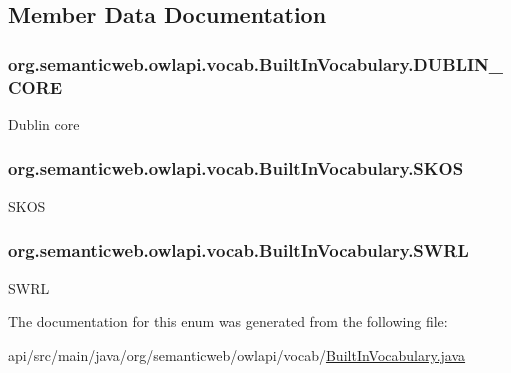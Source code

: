 \subsection{Member Data Documentation}
\hypertarget{enumorg_1_1semanticweb_1_1owlapi_1_1vocab_1_1_built_in_vocabulary_a59c8156f744b057885d6bc7dec488220}{
\subsubsection[{D\-U\-B\-L\-I\-N\-\_\-\-C\-O\-R\-E}]{\setlength{\rightskip}{0pt plus 5cm}org.\-semanticweb.\-owlapi.\-vocab.\-Built\-In\-Vocabulary.\-D\-U\-B\-L\-I\-N\-\_\-\-C\-O\-R\-E}}\label{enumorg_1_1semanticweb_1_1owlapi_1_1vocab_1_1_built_in_vocabulary_a59c8156f744b057885d6bc7dec488220}
Dublin core \hypertarget{enumorg_1_1semanticweb_1_1owlapi_1_1vocab_1_1_built_in_vocabulary_a662cb60c5cb7ce1b88b42f318b2f8699}{
\subsubsection[{S\-K\-O\-S}]{\setlength{\rightskip}{0pt plus 5cm}org.\-semanticweb.\-owlapi.\-vocab.\-Built\-In\-Vocabulary.\-S\-K\-O\-S}}\label{enumorg_1_1semanticweb_1_1owlapi_1_1vocab_1_1_built_in_vocabulary_a662cb60c5cb7ce1b88b42f318b2f8699}
S\-K\-O\-S \hypertarget{enumorg_1_1semanticweb_1_1owlapi_1_1vocab_1_1_built_in_vocabulary_a32b6a4dd0aefc99cabcc8a06996d2756}{
\subsubsection[{S\-W\-R\-L}]{\setlength{\rightskip}{0pt plus 5cm}org.\-semanticweb.\-owlapi.\-vocab.\-Built\-In\-Vocabulary.\-S\-W\-R\-L}}\label{enumorg_1_1semanticweb_1_1owlapi_1_1vocab_1_1_built_in_vocabulary_a32b6a4dd0aefc99cabcc8a06996d2756}
S\-W\-R\-L 

The documentation for this enum was generated from the following file\-:\begin{DoxyCompactItemize}
\item 
api/src/main/java/org/semanticweb/owlapi/vocab/\hyperlink{_built_in_vocabulary_8java}{Built\-In\-Vocabulary.\-java}\end{DoxyCompactItemize}
